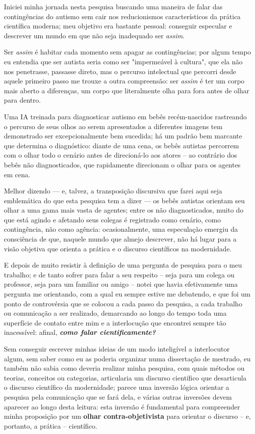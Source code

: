 Iniciei minha jornada nesta pesquisa buscando uma maneira de falar das contingências do autismo sem cair nos reducionismos característicos da prática científica moderna; 
    meu objetivo era bastante pessoal: 
        conseguir especular e descrever um mundo em que não seja inadequado ser \textit{assim}.

Ser \textit{assim} é habitar cada momento sem apagar as contingências;
    por algum tempo eu entendia que ser autista seria como ser "impermeável à cultura", que ela não nos penetrasse, passasse direto, mas o percurso intelectual que percorri desde aquele primeiro passo me trouxe a outra compreensão:
        ser \textit{assim} é ter um corpo mais aberto a diferenças, um corpo que literalmente olha para fora antes de olhar para dentro.

Uma IA treinada para diagnosticar autismo em bebês recém-nascidos rastreando o percurso de seus olhos ao serem apresentados a diferentes imagens tem demonstrado ser excepcionalmente bem sucedida;
    há um padrão bem marcante que determina o diagnóstico:
        diante de uma cena, os bebês autistas percorrem com o olhar todo o cenário antes de direcioná-lo aos atores -- ao contrário dos bebês não diagnosticados, que rapidamente direcionam o olhar para os agentes em cena.

Melhor dizendo --- e, talvez, a transposição discursiva que farei aqui seja emblemática do que esta pesquisa tem a dizer --- os bebês autistas orientam seu olhar a uma gama mais vasta de agentes;
    entre os não diagnosticados, muito do que está agindo e afetando seus colegas é registrado como cenário, como contingência, não como agência:
        ocasionalmente, uma especulação emergiu da consciência de que, naquele mundo que almejo descrever, não há lugar para a visão objetiva que orienta a prática e o discurso científicos na modernidade.

E depois de muito resistir à definição de uma pergunta de pesquisa para o meu trabalho;
    e de tanto sofrer para falar a seu respeito -- seja para um colega ou professor, seja para um familiar ou amigo -- notei que havia efetivamente uma pergunta me orientando, com a qual eu sempre estive me debatendo, e que foi um ponto de controvérsia que se colocou a cada passo da pesquisa, a cada trabalho ou comunicação a ser realizado, demarcando ao longo do tempo toda uma superfície de contato entre mim e a interlocução que encontrei sempre tão inacessível:
        afinal, \textbf{\textit{como falar cientificamente?}}


Sem conseguir escrever minhas ideias de um modo inteligível a interlocutor algum, sem saber como eu as poderia organizar numa dissertação de mestrado, eu também não sabia como deveria realizar minha pesquisa, com quais métodos ou teorias, conceitos ou categorias, articularia um discurso científico que desarticula o discurso científico da modernidade;
    parece uma inversão lógica orientar a pesquisa pela comunicação que se fará dela, e várias outras inversões devem aparecer ao longo desta leitura: 
        esta inversão é fundamental para compreender minha proposição por um \textbf{olhar contra-objetivista} para orientar o discurso -- e, portanto, a prática -- científico.


